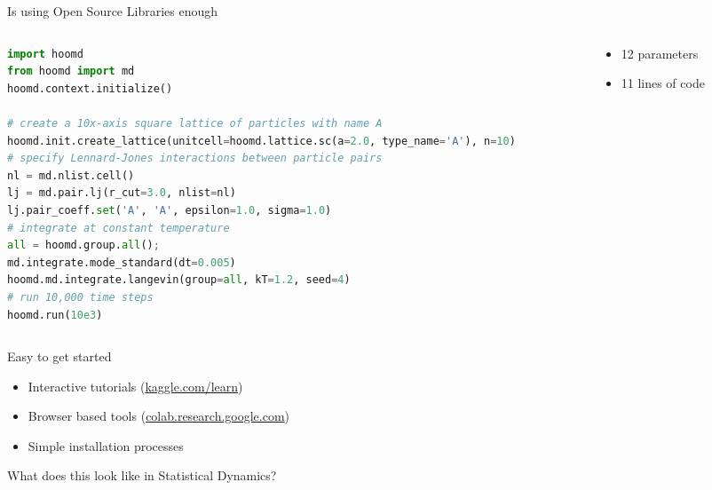 \documentclass[aspectratio=169, 14pt]{beamer}
\begin{document}
\begin{frame}[fragile]{Is using Open Source Libraries enough}

  \begin{columns}
    \begin{column}{0.7\textwidth}
      \scriptsize
      \begin{lstlisting}[language=python]
import hoomd
from hoomd import md
hoomd.context.initialize()

# create a 10x-axis square lattice of particles with name A
hoomd.init.create_lattice(unitcell=hoomd.lattice.sc(a=2.0, type_name='A'), n=10)
# specify Lennard-Jones interactions between particle pairs
nl = md.nlist.cell()
lj = md.pair.lj(r_cut=3.0, nlist=nl)
lj.pair_coeff.set('A', 'A', epsilon=1.0, sigma=1.0)
# integrate at constant temperature
all = hoomd.group.all();
md.integrate.mode_standard(dt=0.005)
hoomd.md.integrate.langevin(group=all, kT=1.2, seed=4)
# run 10,000 time steps
hoomd.run(10e3)
      \end{lstlisting}
    \end{column}

    \begin{column}{0.3\textwidth}
      \vspace{3em}
      \begin{itemize}
        \item 12 parameters
        \item 11 lines of code
      \end{itemize}
    \end{column}
  \end{columns}

\end{frame}


\begin{frame}{Easy to get started}
  \begin{itemize}
    \item Interactive tutorials (\url{kaggle.com/learn})
    \item Browser based tools (\url{colab.research.google.com})
    \item Simple installation processes
  \end{itemize}
\end{frame}


\begin{frame}{}

  \color{usydred}
  \LARGE
  What does this look like in Statistical Dynamics?

\end{frame}
\end{document}
